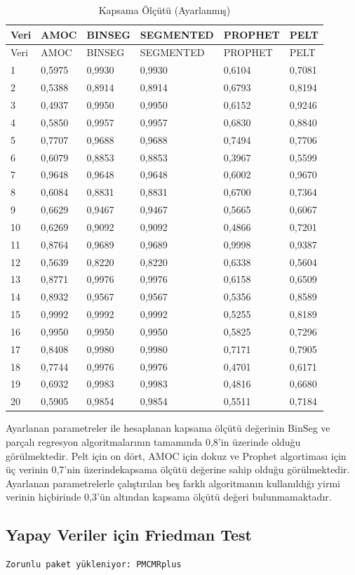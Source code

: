\documentclass[12pt,twoside]{deuthesis}
\begin{document}
\begin{longtable}[]{@{}llllll@{}}
\caption{\label{tab:nvar11} Kapsama Ölçütü (Ayarlanmış)}\tabularnewline
\toprule
Veri & AMOC & BINSEG & SEGMENTED & PROPHET & PELT\tabularnewline
\midrule
\endfirsthead
\toprule
Veri & AMOC & BINSEG & SEGMENTED & PROPHET & PELT\tabularnewline
\midrule
\endhead
1 & 0,5975 & 0,9930 & 0,9930 & 0,6104 & 0,7081\tabularnewline
2 & 0,5388 & 0,8914 & 0,8914 & 0,6793 & 0,8194\tabularnewline
3 & 0,4937 & 0,9950 & 0,9950 & 0,6152 & 0,9246\tabularnewline
4 & 0,5850 & 0,9957 & 0,9957 & 0,6830 & 0,8840\tabularnewline
5 & 0,7707 & 0,9688 & 0,9688 & 0,7494 & 0,7706\tabularnewline
6 & 0,6079 & 0,8853 & 0,8853 & 0,3967 & 0,5599\tabularnewline
7 & 0,9648 & 0,9648 & 0,9648 & 0,6002 & 0,9670\tabularnewline
8 & 0,6084 & 0,8831 & 0,8831 & 0,6700 & 0,7364\tabularnewline
9 & 0,6629 & 0,9467 & 0,9467 & 0,5665 & 0,6067\tabularnewline
10 & 0,6269 & 0,9092 & 0,9092 & 0,4866 & 0,7201\tabularnewline
11 & 0,8764 & 0,9689 & 0,9689 & 0,9998 & 0,9387\tabularnewline
12 & 0,5639 & 0,8220 & 0,8220 & 0,6338 & 0,5604\tabularnewline
13 & 0,8771 & 0,9976 & 0,9976 & 0,6158 & 0,6509\tabularnewline
14 & 0,8932 & 0,9567 & 0,9567 & 0,5356 & 0,8589\tabularnewline
15 & 0,9992 & 0,9992 & 0,9992 & 0,5255 & 0,8189\tabularnewline
16 & 0,9950 & 0,9950 & 0,9950 & 0,5825 & 0,7296\tabularnewline
17 & 0,8408 & 0,9980 & 0,9980 & 0,7171 & 0,7905\tabularnewline
18 & 0,7744 & 0,9976 & 0,9976 & 0,4701 & 0,6171\tabularnewline
19 & 0,6932 & 0,9983 & 0,9983 & 0,4816 & 0,6680\tabularnewline
20 & 0,5905 & 0,9854 & 0,9854 & 0,5511 & 0,7184\tabularnewline
\bottomrule
\end{longtable}

Ayarlanan parametreler ile hesaplanan kapsama ölçütü değerinin BinSeg ve parçalı regresyon algoritmalarının tamamında 0,8'in üzerinde olduğu görülmektedir. Pelt için on dört, AMOC için dokuz ve Prophet algortiması için üç verinin 0,7'nin üzerindekapsama ölçütü değerine sahip olduğu görülmektedir.
Ayarlanan parametrelerle çalıştırılan beş farklı algoritmanın kullanıldığı yirmi verinin hiçbirinde 0,3'ün altından kapsama ölçütü değeri bulunmamaktadır.

\hypertarget{yapay-veriler-iuxe7in-friedman-test}{%
\subsection{Yapay Veriler için Friedman Test}\label{yapay-veriler-iuxe7in-friedman-test}}

\begin{verbatim}
Zorunlu paket yükleniyor: PMCMRplus
\end{verbatim}
\end{document}
